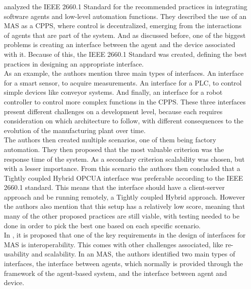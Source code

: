 \citeauthor{Leitao2021} \cite{Leitao2021} analyzed the IEEE 2660.1 Standard for the recommended practices in integrating software agents and low-level automation functions. They described the use of an \acrshort{MAS} as a \acrshort{CPPS}, where control is decentralized, emerging from the interactions of agents that are part of the system. And as discussed before, one of the biggest problems is creating an interface between the agent and the device associated with it. Because of this, the IEEE 2660.1 Standard was created, defining the best practices in designing an appropriate interface.\\

As an example, the authors mention three main types of interfaces. An interface for a smart sensor, to acquire measurements. An interface for a \acrshort{PLC}, to control simple devices like conveyor systems. And finally, an interface for a robot controller to control more complex functions in the \acrshort{CPPS}. These three interfaces present different challenges on a development level, because each requires consideration on which architecture to follow, with different consequences to the evolution of the manufacturing plant over time.\\

The authors then created multiple scenarios, one of them being factory automation. They then proposed that the most valuable criterion was the response time of the system. As a secondary criterion scalability was chosen, but with a lesser importance. From this scenario the authors then concluded that a Tightly coupled Hybrid \acrshort{OPCUA} interface was preferable according to the IEEE 2660.1 standard. This means that the interface should have a client-server approach and be running remotely, a Tightly coupled Hybrid approach. However the authors also mention that this setup has a relatively low score, meaning that many of the other proposed practices are still viable, with testing needed to be done in order to pick the best one based on each specific scenario.\\


In \cite{Karnouskos2019}, it is proposed that one of the key requirements in the design of interfaces for \acrshort{MAS} is interoperability. This comes with other challenges associated, like re-usability and scalability. In an \acrshort{MAS}, the authors identified two main types of interfaces, the interface between agents, which normally is provided through the framework of the agent-based system, and the interface between agent and device. \\


